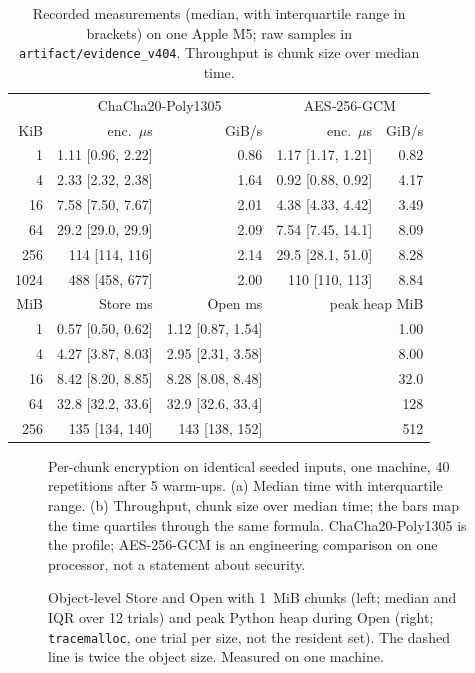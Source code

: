 \documentclass[pdflatex,sn-mathphys-num,twocolumn]{sn-jnl}
\theoremstyle{plain}
\theoremstyle{definition}
\newcommand{\code}[1]{\texttt{#1}}
\begin{document}
\begin{table}[t]
\caption{Recorded measurements (median, with interquartile range in brackets) on one Apple M5; raw samples in \code{artifact/evidence\_v404}. Throughput is chunk size over median time.}\label{tab:bench}
\centering\footnotesize
\begin{tabular}{@{}rrrrr@{}}\toprule
& \multicolumn{2}{c}{ChaCha20-Poly1305} & \multicolumn{2}{c}{AES-256-GCM}\\
KiB & enc.\ $\mu$s & GiB/s & enc.\ $\mu$s & GiB/s\\\midrule
1 & 1.11 [0.96, 2.22] & 0.86 & 1.17 [1.17, 1.21] & 0.82\\
4 & 2.33 [2.32, 2.38] & 1.64 & 0.92 [0.88, 0.92] & 4.17\\
16 & 7.58 [7.50, 7.67] & 2.01 & 4.38 [4.33, 4.42] & 3.49\\
64 & 29.2 [29.0, 29.9] & 2.09 & 7.54 [7.45, 14.1] & 8.09\\
256 & 114 [114, 116] & 2.14 & 29.5 [28.1, 51.0] & 8.28\\
1024 & 488 [458, 677] & 2.00 & 110 [110, 113] & 8.84\\\midrule
MiB & Store ms & Open ms & \multicolumn{2}{r}{peak heap MiB}\\\midrule
1 & 0.57 [0.50, 0.62] & 1.12 [0.87, 1.54] & \multicolumn{2}{r}{1.00}\\
4 & 4.27 [3.87, 8.03] & 2.95 [2.31, 3.58] & \multicolumn{2}{r}{8.00}\\
16 & 8.42 [8.20, 8.85] & 8.28 [8.08, 8.48] & \multicolumn{2}{r}{32.0}\\
64 & 32.8 [32.2, 33.6] & 32.9 [32.6, 33.4] & \multicolumn{2}{r}{128}\\
256 & 135 [134, 140] & 143 [138, 152] & \multicolumn{2}{r}{512}\\\bottomrule
\end{tabular}
\end{table}

\begin{figure}[t]
\centering

\caption{Per-chunk encryption on identical seeded inputs, one machine, 40 repetitions after 5 warm-ups. (a) Median time with interquartile range. (b) Throughput, chunk size over median time; the bars map the time quartiles through the same formula. ChaCha20-Poly1305 is the profile; AES-256-GCM is an engineering comparison on one processor, not a statement about security.}\label{fig:latency}
\end{figure}

\begin{figure}[t]
\centering

\caption{Object-level Store and Open with 1~MiB chunks (left; median and IQR over 12 trials) and peak Python heap during Open (right; \code{tracemalloc}, one trial per size, not the resident set). The dashed line is twice the object size. Measured on one machine.}\label{fig:objects}
\end{figure}
\end{document}
